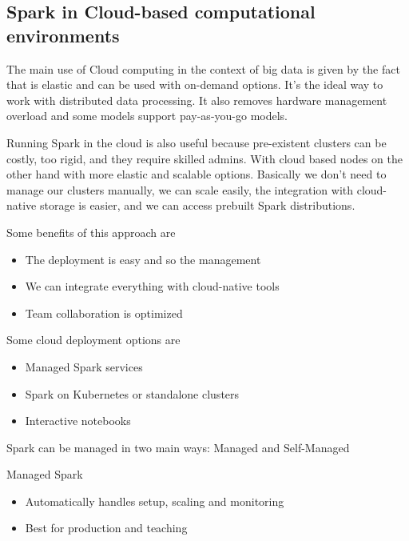 \subsection{Spark in Cloud-based computational environments}

The main use of Cloud computing in the context of big data is given by the fact that is elastic and can be used with on-demand options. It's the ideal way to work with distributed data processing. It also removes hardware management overload and some models support pay-as-you-go models. 

\vspace{10pt}

Running Spark in the cloud is also useful because pre-existent clusters can be costly, too rigid, and they require skilled admins. With cloud based nodes on the other hand with more elastic and scalable options. Basically we don't need to manage our clusters manually, we can scale easily, the integration with cloud-native storage is easier, and we can access prebuilt Spark distributions.

\vspace{10pt}

Some benefits of this approach are

\begin{itemize}
    \item The deployment is easy and so the management
    \item We can integrate everything with cloud-native tools
    \item Team collaboration is optimized
\end{itemize}

Some cloud deployment options are

\begin{itemize}
    \item Managed Spark services
    \item Spark on Kubernetes or standalone clusters
    \item Interactive notebooks
\end{itemize}

Spark can be managed in two main ways: Managed and Self-Managed

\vspace{10pt}

Managed Spark

\begin{itemize}
    \item Automatically handles setup, scaling and monitoring
    \item Best for production and teaching
\end{itemize}

